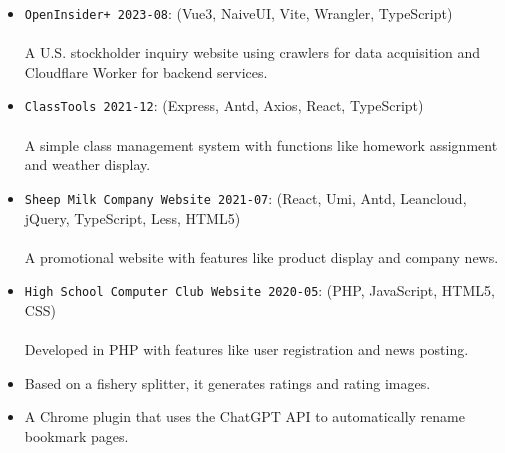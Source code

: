 \documentclass{resume}
\begin{document}
\begin{itemize}
  \item \texttt{OpenInsider+ 2023-08}:
    (Vue3, NaiveUI, Vite, Wrangler, TypeScript)\\
    \\
    A U.S. stockholder inquiry website using crawlers for data acquisition and Cloudflare Worker for backend services.\\
  \item \texttt{ClassTools 2021-12}:
    (Express, Antd, Axios, React, TypeScript)\\
    \\
    A simple class management system with functions like homework assignment and weather display.\\
  \item \texttt{Sheep Milk Company Website 2021-07}:
    (React, Umi, Antd, Leancloud, jQuery, TypeScript, Less, HTML5)\\
    \\
    A promotional website with features like product display and company news.\\
  \item \texttt{High School Computer Club Website 2020-05}:
    (PHP, JavaScript, HTML5, CSS)\\
    \\
    Developed in PHP with features like user registration and news posting.\\
\end{itemize}

\begin{itemize}
  \item Based on a fishery splitter, it generates ratings and rating images.
  \item A Chrome plugin that uses the ChatGPT API to automatically rename bookmark pages.
\end{itemize}
\end{document}
